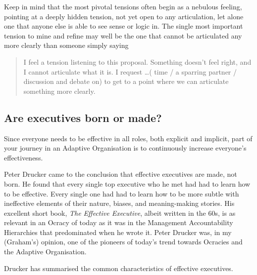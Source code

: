 Keep in mind that the most pivotal tensions often begin as a nebulous feeling, pointing at a deeply hidden tension, not yet open to any articulation, let alone one that anyone else is able to see sense or logic in. The single most important tension to mine and refine may well be the one that cannot be articulated any more clearly than someone simply saying 


\begin{quote} 
I feel a tension listening to this proposal. Something doesn't feel right, and I cannot articulate what it is. I request \ldots ( time / a sparring partner / discussion and debate on) to get to a point where we can articulate something more clearly.  
\end{quote}


\subsection{Are executives born or made?}
Since everyone needs to be effective in all roles, both explicit and implicit, part of your journey in an Adaptive Organisation is to continuously increase everyone’s effectiveness. 


Peter Drucker came to the conclusion that effective executives are made, not born. He found that every single top executive who he met had had to learn how to be effective. Every single one had had to learn how to be more subtle with ineffective elements of their nature, biases, and meaning\hyp{}making stories. His excellent short book, \emph{The Effective Executive}\cite{drucker-eff-exec}, albeit written in the 60s, is as relevant in an Ocracy of today as it was in the Management Accountability Hierarchies that predominated when he wrote it. Peter Drucker was, in my (Graham’s) opinion, one of the pioneers of today's trend towards Ocracies and the Adaptive Organisation.


Drucker has summarised the common characteristics of effective executives.


